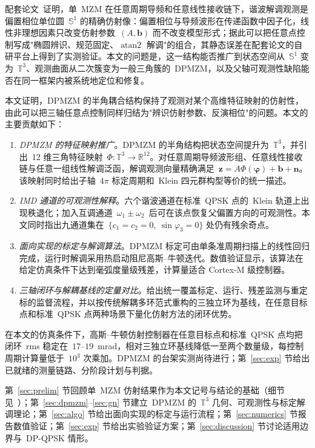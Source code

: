 \documentclass[11pt,journal,onecolumn]{IEEEtran}
\theoremstyle{plain}
\theoremstyle{remark}
\newcommand{\zv}{\mathbf{z}}
\newcommand{\bv}{\mathbf{b}}
\newcommand{\nv}{\mathbf{n}}
\newcommand{\phiv}{\bm{\varphi}}
\newcommand{\atan}{\operatorname{atan2}}
\begin{document}
配套论文~\cite{mzmaffine}证明，单~MZM 在任意周期导频和任意线性接收链下，谐波解调观测是偏置相位单位圆~$\mathbb{S}^1$ 的精确仿射像：偏置相位与导频波形在传递函数中因子化，线性非理想因素只改变仿射参数~$(A,\bv)$ 而不改变模型形式；据此可以把任意点控制写成"椭圆辨识、规范固定、$\atan$ 解调"的组合，其静态误差在配套论文的自研平台上得到了实测验证。本文的问题是，这一结构能否推广到状态空间从~$\mathbb{S}^1$ 变为~$\mathbb{T}^3$、观测曲面从二次簇变为一般三角簇的~DPMZM，以及父轴可观测性缺陷能否在同一框架内被系统地定位和修复。

本文证明，DPMZM 的半角耦合结构保持了观测对某个高维特征映射的仿射性，由此可以把三轴任意点控制同样归结为"辨识仿射参数、反演相位"的问题。本文的主要贡献如下：

\begin{enumerate}
\item \emph{DPMZM 的特征映射推广}。DPMZM 的半角结构把状态空间提升为~$\mathbb{T}^3$，并引出~12 维三角特征映射~$\Phi:\mathbb{T}^3\to\mathbb{R}^{12}$。对任意周期导频波形组、任意线性接收链与任意一组线性解调泛函，解调观测向量精确满足~$\zv=A\Phi(\phiv)+\bv+\nv$。该映射同时给出子轴~$4\pi$ 标定周期和~Klein 四元群构型等价的统一描述。
\item \emph{IMD 通道的可观测性解释}。六个谐波通道在标准~QPSK 点的~Klein 轨道上出现秩退化；加入互调通道~$\omega_1\!\pm\!\omega_2$~\cite{kawakami2012}后可在该点恢复父偏置方向的可观测性。本文同时指出九通道集在~$\{c_1{=}c_2{=}0,\ \sin\varphi_3{=}0\}$ 处仍有残余奇点。
\item \emph{面向实现的标定与解调算法}。DPMZM 标定可由单条准周期扫描上的线性回归完成，运行时解调采用热启动阻尼高斯--牛顿迭代。数值验证显示，该算法在给定仿真条件下达到毫弧度量级残差，计算量适合 Cortex-M 级控制器。
\item \emph{三轴闭环与解耦基线的定量对比}。给出统一覆盖标定、运行、残差监测与重定标的监督流程，并以按传统解耦多环范式重构的三独立环为基线，在任意目标点和标准~QPSK 点两种场景下量化仿射方法的闭环优势。
\end{enumerate}

在本文的仿真条件下，高斯--牛顿仿射控制器在任意目标点和标准~QPSK 点均把闭环~rms 稳定在~$17$--$19$~mrad，相对三独立环基线降低一至两个数量级，每控制周期计算量低于~$10^3$ 次乘加。DPMZM 的台架实测尚待进行；第~\ref{sec:exp} 节给出已就绪的测量链路、分阶段计划与判据。

第~\ref{sec:prelim} 节回顾单~MZM 仿射结果作为本文记号与结论的基础（细节见~\cite{mzmaffine}）；第~\ref{sec:dpmzm}--\ref{sec:gn} 节建立~DPMZM 的~$\mathbb{T}^3$ 几何、可观测性与标定解调理论；第~\ref{sec:algo} 节给出面向实现的标定与运行流程；第~\ref{sec:numerics} 节报告数值验证；第~\ref{sec:exp} 节给出实验验证方案；第~\ref{sec:discussion} 节讨论适用边界与~DP-QPSK 情形。
\end{document}
